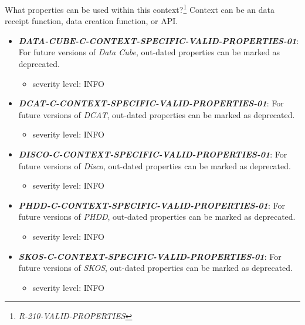 \documentclass{llncs}
\begin{document}
What properties can be used within this context?\footnote{\emph{R-210-VALID-PROPERTIES}} 
Context can be an data receipt function, data creation function, or API.

\begin{itemize}
	\item \textbf{{\em DATA-CUBE-C-CONTEXT-SPECIFIC-VALID-PROPERTIES-01}}: For future versions of \emph{Data Cube}, out-dated properties can be marked as deprecated.
	\begin{itemize}
		\item severity level: INFO
	\end{itemize}
\end{itemize}

\begin{itemize}
	\item \textbf{{\em DCAT-C-CONTEXT-SPECIFIC-VALID-PROPERTIES-01}}: For future versions of \emph{DCAT}, out-dated properties can be marked as deprecated.
	\begin{itemize}
		\item severity level: INFO
	\end{itemize}
\end{itemize}

\begin{itemize}
	\item \textbf{{\em DISCO-C-CONTEXT-SPECIFIC-VALID-PROPERTIES-01}}: For future versions of \emph{Disco}, out-dated properties can be marked as deprecated.
	\begin{itemize}
		\item severity level: INFO
	\end{itemize}
\end{itemize}

\begin{itemize}
	\item \textbf{{\em PHDD-C-CONTEXT-SPECIFIC-VALID-PROPERTIES-01}}: For future versions of \emph{PHDD}, out-dated properties can be marked as deprecated.
	\begin{itemize}
		\item severity level: INFO
	\end{itemize}
\end{itemize}

\begin{itemize}
	\item \textbf{{\em SKOS-C-CONTEXT-SPECIFIC-VALID-PROPERTIES-01}}: For future versions of \emph{SKOS}, out-dated properties can be marked as deprecated.
	\begin{itemize}
		\item severity level: INFO
	\end{itemize}
\end{itemize}
\end{document}
